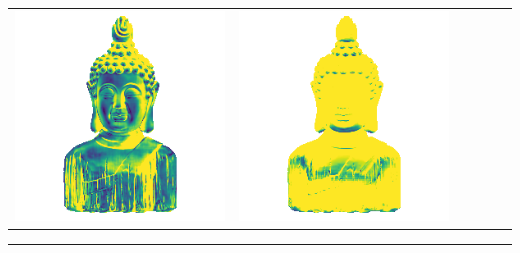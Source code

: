\begin{tabularx}{\linewidth}{@{}Y@{}Y@{}Y@{}Y@{}Y@{}Y@{}}
\includegraphics[width=\linewidth]{semisynthetic/20160617_16_marrnet_err.png} &
\includegraphics[width=\linewidth]{semisynthetic/20160617_16_ef_err.png} \\
\end{tabularx}
\begin{center}\rule{0.5\linewidth}{\linethickness}\end{center}

